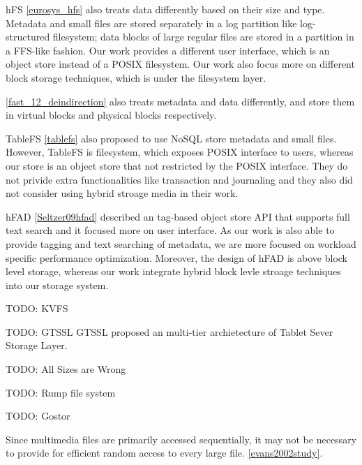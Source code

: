 hFS \ref{eurosys_hfs} also treats data differently based on their size and
type. Metadata and small files are stored separately in a log partition like
log-structured filesystem; data blocks of large regular files are stored in a
partition in a FFS-like fashion. Our work provides a different user interface,
which is an object store instead of a POSIX filesystem. Our work also focus
more on different block storage techniques, which is under the filesystem
layer.

\ref{fast_12_deindirection} also treats metadata and data differently, and
store them in virtual blocks and physical blocks respectively.

TableFS \ref{tablefs} also proposed to use NoSQL store metadata and small
files. However, TableFS is filesystem, which exposes POSIX interface to users,
whereas our store is an object store that not restricted by the POSIX
interface.  They do not privide extra functionalities like transaction and
journaling and they also did not consider using hybrid stroage media in their
work.

hFAD \ref{Seltzer09hfad} described an tag-based object store API that supports
full text search and it focused more on user interface. As our work is also
able to provide tagging and text searching of metadata, we are more focused on
workload specific performance optimization. Moreover, the design of hFAD is
above block level storage, whereas our work integrate hybrid block levle
stroage techniques into our storage system.

TODO: KVFS

TODO: GTSSL
GTSSL proposed an multi-tier archietecture of Tablet Sever Storage Layer.

TODO: All Sizes are Wrong

TODO: Rump file system

TODO: Gostor

Since multimedia files are primarily accessed sequentially, it may not be
necessary to provide for efficient random access to every large file.
\ref{evans2002study}.
